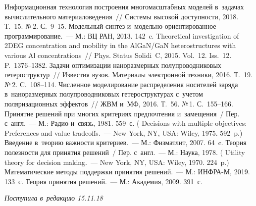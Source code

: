 \begin{multicols}{2}
  {\small\frenchspacing
 {%
 \begin{thebibliography}{99}
     Информационная технология по\-стро\-ения многомасштабных моделей 
в~задачах вычислительного материаловедения~// Системы высокой доступности, 2018. Т.~15. 
№\,2. С.~9--15.
     Модельный синтез и~мо\-дель\-но-ори\-ен\-ти\-ро\-ван\-ное 
    программирование.~---  М.: ВЦ РАН, 2013. 142~c.
    Theoretical investigation of 2DEG 
concentration and mobility in the AlGaN/GaN heterostructures with various Al concentrations~// 
Phys. Status Solidi~C, 2015. Vol.~12. Iss.~12. P.~1376--1382.
    Задачи оптимизации наноразмерных полупроводниковых гетероструктур~// 
Известия вузов. Материалы электронной техники, 2016. Т.~19. №\,2. C.~108--114.
    Численное моделирование распределения носителей 
заряда в~наноразмерных полупроводниковых гетероструктурах с~учетом поляризационных 
эффектов~// ЖВМ и~МФ, 2016. Т.~56. №\,1. С.~155--166.
     Принятие решений при многих критериях предпочтения 
    и~замещения~/ Пер. с~англ.~--- М.: Радио и~связь, 1981. 559~с. 
    ( Decisions with 
multiple objectives: Preferences and value tradeoffs.~--- New York, NY, USA: Wiley, 
1975. 592~p.)
     Введение в~теорию важности критериев.~--- М.: Физматлит, 2007. 64~c.
     Теория полезности для принятия решений~/ Пер. с~англ.~--- М.: 
    Наука, 1978. 
( Utility theory for decision making.~--- New York, NY, USA: 
Wiley, 1970. 224~p.)
     Математические методы поддержки принятия решений.~--- 
М.: ИНФРА-М, 2019. 133~с.
     Теория принятия решений.~--- М.: Академия, 2009. 391~с.
 \end{thebibliography}

 }
 }

\end{multicols}

\vspace*{-6pt}

\hfill{\small\textit{Поступила в~редакцию 15.11.18}}

\vspace*{6pt}

